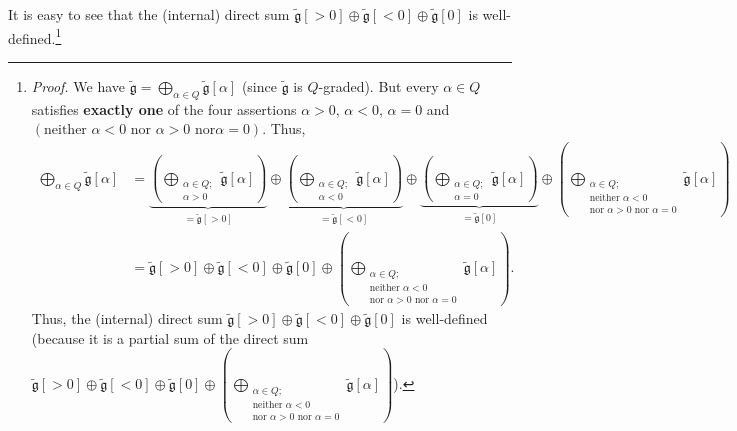 \documentclass[etingof-lie.tex]{subfiles}
\begin{document}
It is easy to see that the (internal) direct sum $\widetilde{\mathfrak{g}%
}\left[  >0\right]  \oplus\widetilde{\mathfrak{g}}\left[  <0\right]
\oplus\widetilde{\mathfrak{g}}\left[  0\right]  $ is
well-defined.\footnote{\textit{Proof.} We have $\widetilde{\mathfrak{g}%
}=\bigoplus\limits_{\alpha\in Q}\widetilde{\mathfrak{g}}\left[  \alpha\right]
$ (since $\widetilde{\mathfrak{g}}$ is $Q$-graded). But every $\alpha\in Q$
satisfies \textbf{exactly one} of the four assertions $\alpha>0$, $\alpha<0$,
$\alpha=0$ and $\left(  \text{neither }\alpha<0\text{ nor }\alpha>0\text{ nor
}\alpha=0\right)  $. Thus,%
\begin{align*}
\bigoplus\limits_{\alpha\in Q}\widetilde{\mathfrak{g}}\left[  \alpha\right]
&  =\underbrace{\left(  \bigoplus\limits_{\substack{\alpha\in Q;\\\alpha
>0}}\widetilde{\mathfrak{g}}\left[  \alpha\right]  \right)  }%
_{=\widetilde{\mathfrak{g}}\left[  >0\right]  }\oplus\underbrace{\left(
\bigoplus\limits_{\substack{\alpha\in Q;\\\alpha<0}}\widetilde{\mathfrak{g}%
}\left[  \alpha\right]  \right)  }_{=\widetilde{\mathfrak{g}}\left[
<0\right]  }\oplus\underbrace{\left(  \bigoplus\limits_{\substack{\alpha\in
Q;\\\alpha=0}}\widetilde{\mathfrak{g}}\left[  \alpha\right]  \right)
}_{=\widetilde{\mathfrak{g}}\left[  0\right]  }\oplus\left(  \bigoplus
\limits_{\substack{\alpha\in Q;\\\text{neither }\alpha<0\\\text{nor }%
\alpha>0\text{ nor }\alpha=0}}\widetilde{\mathfrak{g}}\left[  \alpha\right]
\right) \\
&  =\widetilde{\mathfrak{g}}\left[  >0\right]  \oplus\widetilde{\mathfrak{g}%
}\left[  <0\right]  \oplus\widetilde{\mathfrak{g}}\left[  0\right]
\oplus\left(  \bigoplus\limits_{\substack{\alpha\in Q;\\\text{neither }%
\alpha<0\\\text{nor }\alpha>0\text{ nor }\alpha=0}}\widetilde{\mathfrak{g}%
}\left[  \alpha\right]  \right)  .
\end{align*}
Thus, the (internal) direct sum $\widetilde{\mathfrak{g}}\left[  >0\right]
\oplus\widetilde{\mathfrak{g}}\left[  <0\right]  \oplus\widetilde{\mathfrak{g}%
}\left[  0\right]  $ is well-defined (because it is a partial sum of the
direct sum $\widetilde{\mathfrak{g}}\left[  >0\right]  \oplus
\widetilde{\mathfrak{g}}\left[  <0\right]  \oplus\widetilde{\mathfrak{g}%
}\left[  0\right]  \oplus\left(  \bigoplus\limits_{\substack{\alpha\in
Q;\\\text{neither }\alpha<0\\\text{nor }\alpha>0\text{ nor }\alpha
=0}}\widetilde{\mathfrak{g}}\left[  \alpha\right]  \right)  $).}
\end{document}
